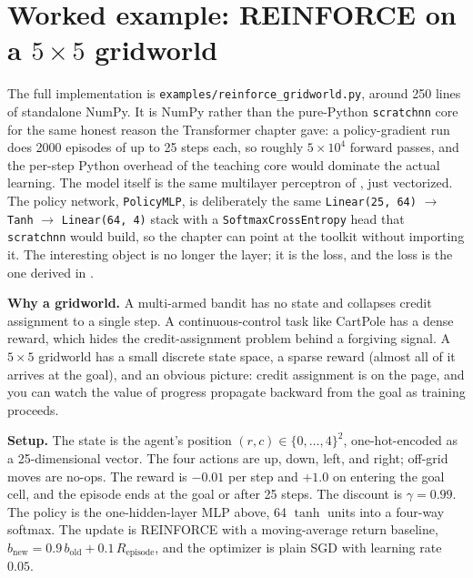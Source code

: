 
\section{Worked example: REINFORCE on a \texorpdfstring{$5 \times 5$}{5x5} gridworld}\label{sec:gridworld}

The full implementation is \texttt{examples/reinforce\_gridworld.py}, around
250 lines of standalone NumPy. It is NumPy rather than the pure-Python
\texttt{scratchnn} core for the same honest reason the Transformer chapter
gave: a policy-gradient run does 2000 episodes of up to 25 steps each, so
roughly $5 \times 10^4$ forward passes, and the per-step Python overhead of
the teaching core would dominate the actual learning. The model itself is the
same multilayer perceptron of , just vectorized. The
policy network, \texttt{PolicyMLP}, is deliberately the same
\texttt{Linear(25, 64)} $\to$ \texttt{Tanh} $\to$ \texttt{Linear(64, 4)} stack
with a \texttt{SoftmaxCrossEntropy} head that \texttt{scratchnn} would build,
so the chapter can point at the toolkit without importing it. The interesting
object is no longer the layer; it is the loss, and the loss is the one derived
in .

\textbf{Why a gridworld.} A multi-armed bandit has no state and collapses
credit assignment to a single step. A continuous-control task like CartPole
has a dense reward, which hides the credit-assignment problem behind a
forgiving signal. A $5 \times 5$ gridworld has a small discrete state space, a
sparse reward (almost all of it arrives at the goal), and an obvious picture:
credit assignment is on the page, and you can watch the value of progress
propagate backward from the goal as training proceeds.

\textbf{Setup.} The state is the agent's position $(r, c) \in \{0, \ldots,
4\}^2$, one-hot-encoded as a 25-dimensional vector. The four actions are up,
down, left, and right; off-grid moves are no-ops. The reward is $-0.01$ per
step and $+1.0$ on entering the goal cell, and the episode ends at the goal or
after 25 steps. The discount is $\gamma = 0.99$. The policy is the
one-hidden-layer MLP above, 64 $\tanh$ units into a four-way softmax. The
update is REINFORCE with a moving-average return baseline, $b_{\text{new}} =
0.9\, b_{\text{old}} + 0.1\, R_{\text{episode}}$, and the optimizer is plain
SGD with learning rate $0.05$.

